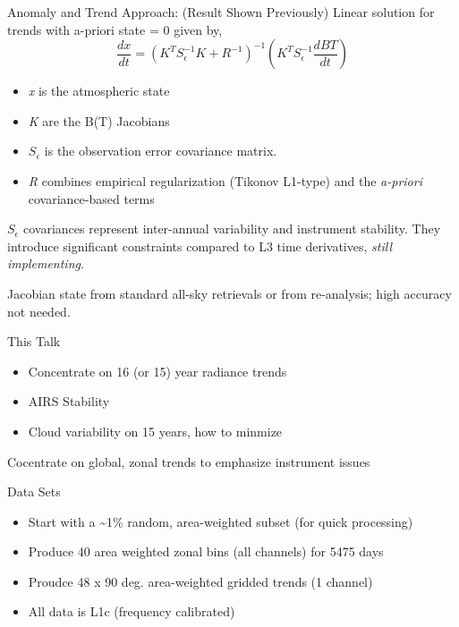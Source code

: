 \documentclass[10pt,t]{beamer}
\begin{document}
\begin{frame}[label={sec:org35ba5a1}]{Anomaly and Trend Approach: (Result Shown Previously)}
Linear solution for trends with a-priori state = 0 given by,
\begin{displaymath}
\frac{dx}{dt} =  \left(K^T S_{\epsilon}^{-1} K + R^{-1}\right)^{-1} \left(K^T S_{\epsilon}^{-1} \frac{dBT}{dt}\right)
\end{displaymath}

\begin{itemize}
\item \emph{x} is the atmospheric state
\item \emph{K} are the B(T) Jacobians
\item \(S_{\epsilon}\) is the observation error covariance matrix.
\item \emph{R} combines empirical regularization (Tikonov L1-type) and the \emph{a-priori} covariance-based terms
\end{itemize}

\(S_\epsilon\) covariances represent inter-annual variability and instrument stability.  They introduce significant constraints compared to L3 time derivatives, \emph{still implementing}.

Jacobian state from standard all-sky retrievals or from re-analysis; high accuracy not needed.
\end{frame}

\begin{frame}[label={sec:orga634cfa}]{This Talk}
\begin{itemize}
\item Concentrate on 16 (or 15) year radiance trends
\item AIRS Stability
\item Cloud variability on 15 years, how to minmize
\end{itemize}

Cocentrate on global, zonal trends to emphasize instrument issues

\begin{block}{Data Sets}
\begin{itemize}
\item Start with a \textasciitilde{}1\% random, area-weighted subset (for quick processing)
\item Produce 40 area weighted zonal bins (all channels) for 5475 days
\item Proudce 48 x 90 deg. area-weighted gridded trends (1 channel)
\item All data is L1c (frequency calibrated)
\end{itemize}
\end{block}
\end{frame}
\end{document}
